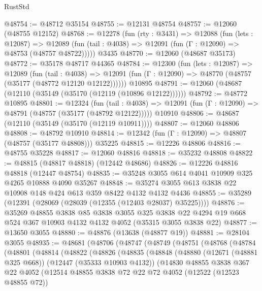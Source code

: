 \begin{lexlean}{RustStd}
\begin{coremodule}
@48754 := @48712 @35154
@48755 := @12131 @48754
@48757 := @12060 (@48755 @12152)
@48768 := @12278
    (fun (rty : @3431) =>
    @12088
      (fun (lets : @12087) =>
      @12089 (fun (tail : @4038) => @12091 (fun (Γ : @12090) => @48753 (@48757 @48722)))))
    @3435
@48770 := @12060 (@48687 @35173)
@48772 := @35178 @48717 @44365
@48784 := @12300
    (fun (lets : @12087) =>
    @12089
      (fun (tail : @4038) =>
      @12091 (fun (Γ : @12090) => @48770 (@48757 (@35177 (@48772 @12120 @12122))))))
    @10895
@48791 := @12060 (@48687 (@12110 (@35149 (@35170 (@12119 (@10896 @12122))))))
@48792 := @48772 @10895
@48801 := @12324
    (fun (tail : @4038) => @12091 (fun (Γ : @12090) => @48791 (@48757 (@35177 (@48792 @12122)))))
    @10910
@48806 := @48687 (@12110 (@35149 (@35170 (@12119 @10911))))
@48807 := @12060 @48806
@48808 := @48792 @10910
@48814 := @12342 (fun (Γ : @12090) => @48807 (@48757 (@35177 @48808))) @35225
@48815 := @12226 @48806
@48816 := @48755 @35228
@48817 := @12060 @48816
@48818 := @35232 @48808
@48822 := @48815 (@48817 @48818) (@12442 @48686)
@48826 := @12226 @48816 @48818 (@12447 @48754)
@48835 := @35248 @3055 @614 @4041 @10909 @325 @4265 @10888 @4090 @35267
@48848 := @35274 @3055 @613 @3838 @22 @10908 @148 @424 @613 @359 @8422 @4132 @4132 @4436
@48855 := @35289 (@12391 (@28069 (@28039 (@12355 (@12403 @28037) @35225))))
@48876 := @35269
    @48855
    @3838
    @85
    @3838
    @3055
    @325
    @3838
    @22
    @4294
    @19
    @668
    @524
    @367
    @10903
    @4132
    @4132
    @4052
    (@35315 @3055 @3838 @22)
@48877 := @13650 @3055
@48880 := @48876 (@13638 (@48877 @19))
@48881 := @28104 @3055
@48935 := @48681
    (@48706
      (@48747
        (@48749
          (@48751
            (@48768
              (@48784
                (@48801
                  (@48814
                    (@48822
                      (@48826
                        (@48835
                          (@48848
                            (@48880
                              (@12671 (@48881 @325 @668))
                              (@12447 (@35333 @10903 @4132))
                              (@14830
                                @48855
                                @3838
                                @367
                                @22
                                @4052
                                (@12514
                                  @48855
                                  @3838
                                  @72
                                  @22
                                  @72
                                  @4052
                                  (@12522 (@12523 @48855 @72))

\end{coremodule}
\end{lexlean}
